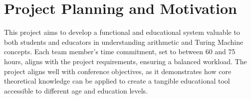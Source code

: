 \documentclass[a4paper,12pt]{article}
\begin{document}
\section*{Project Planning and Motivation}

This project aims to develop a functional and educational system valuable to both students and educators in understanding arithmetic and Turing Machine concepts. Each team member's time commitment, set to between 60 and 75 hours, aligns with the project requirements, ensuring a balanced workload. The project aligns well with conference objectives, as it demonstrates how core theoretical knowledge can be applied to create a tangible educational tool accessible to different age and education levels.
\end{document}
